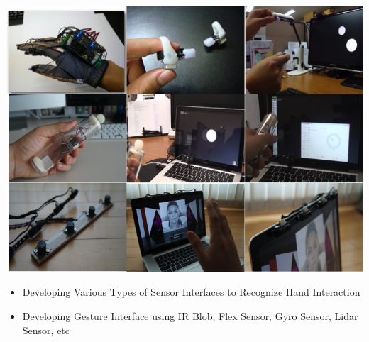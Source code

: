 \begin{cventries}
{\begin{cvitems}
{          \includegraphics[width=\linewidth]{resources/gesturedevices.png}
          \begin{itemize}
            \item {Developing Various Types of Sensor Interfaces to Recognize Hand Interaction}
            \item {Developing Gesture Interface using IR Blob, Flex Sensor, Gyro Sensor, Lidar Sensor, etc}
          \end{itemize}
        }
      \end{cvitems}
    }
\end{cventries}
